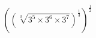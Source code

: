 \documentclass[preview]{standalone}
\begin{document}
\begin{align*}
\left( \left(\sqrt[3]{3^5 \times 3^6 \times 3^7} \right)^\frac{1}{3} \right)^\frac{1}{2}
\end{align*}
\end{document}
